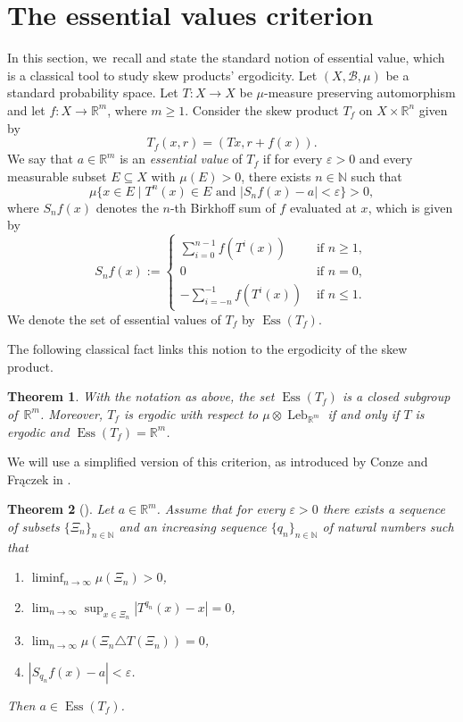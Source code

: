 \documentclass[10pt,a4paper]{amsart}
\let\epsilon\varepsilon
\DeclareMathOperator{\Ess}{Ess}
\DeclareMathOperator{\Leb}{Leb}
\theoremstyle{plain}
\newtheorem{theorem}{Theorem}[section]
\theoremstyle{definition}
\newcommand{\N}{\mathbb{N}}
\newcommand{\R}{\mathbb{R}}
\begin{document}
\section{The essential values criterion}
In this section, we~recall and state the standard notion of essential value, which is a classical tool to study skew products' ergodicity. Let $(X,\mathcal B, \mu)$ be a standard probability space. Let $T:X\to X$ be $\mu$-measure preserving automorphism and let $f:X\to \R^m$, where $m \geq 1$. Consider the skew product $T_f$ on $X\times \R^n$ given by
\[
T_f(x,r)=(Tx,r+f(x)).
\]
We say that $a\in\R^m$ is an \emph{essential value} of $T_f$ if for every $\epsilon>0$ and every measurable subset $E\subseteq X$ with $\mu(E)>0$, there exists $n\in\N$ such that
\[
\mu\{x\in E\mid T^{n}(x)\in E\text{ and }|S_n f(x)-a|<\epsilon\}>0,
\]
where $S_n f (x)$ denotes the $n$-th Birkhoff sum of $f$ evaluated at $x$, which is given by
\begin{equation}
\label{eq:Birkhoff_sums}
S_n f (x):=\begin{cases}
\sum_{i=0}^{n-1}f(T^{i}(x))& \text{ if }n\ge 1,\\
0&\text{ if }n=0,\\
-\sum_{i=-n}^{-1}f(T^{i}(x))&\text{ if }n\le 1.
\end{cases}
\end{equation}
We denote the set of essential values of $T_f$ by $\Ess(T_f)$.

The following classical fact links this notion to the ergodicity of the skew product.
\begin{theorem}\label{thm: essvalues}
With the notation as above, the set $\Ess(T_f)$ is a closed subgroup of~$\R^m$. Moreover, $T_f$ is ergodic with respect to $\mu\otimes \Leb_{\R^m}$ if and only if $T$ is ergodic and $\Ess(T_f)=\R^m$.
\end{theorem}
We will use a simplified version of this criterion, as introduced by Conze and Frączek in
\cite{conze_cocycles_2011}.

\begin{theorem}[{\cite[Lem.\,2.7]{conze_cocycles_2011}}]\label{thm: FUcriterion}
Let $a\in\R^m$. Assume that for every $\epsilon>0$ there exists a sequence
of subsets $\{\Xi_n\}_{n\in\N}$ and an increasing sequence
$\{q_n\}_{n\in\N}$ of natural numbers such that
\begin{enumerate}
\item \label{cond:measure} $\liminf_{n\to\infty}\mu(\Xi_n)>0$,
\item \label{cond:rigidity}$\lim_{n\to\infty}\sup_{x\in \Xi_n}|T^{q_n}(x)-x|=0$,
\item \label{cond:almost_invariant} $\lim_{n\to\infty}\mu(\Xi_n\triangle T(\Xi_n))=0$,
\item \label{cond:BS} $|S_{q_n}f(x)-a|<\epsilon$.
\end{enumerate}
Then $a\in \Ess(T_f)$.
\end{theorem}
\end{document}
